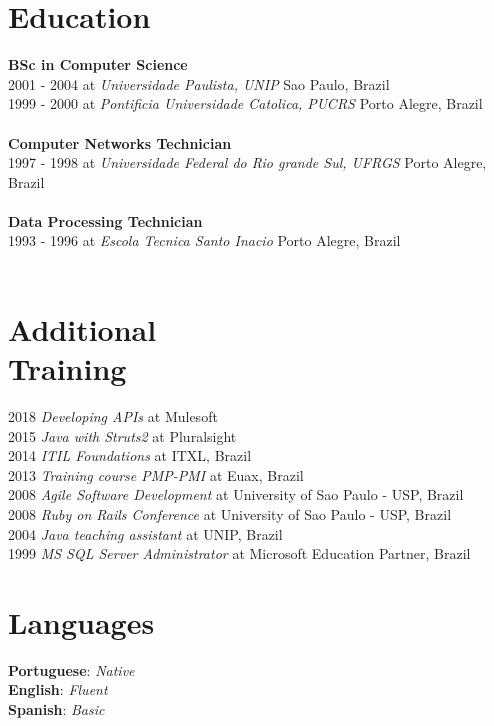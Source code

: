 \documentclass[margin]{res}
\begin{document}
\begin{resume}
\pagebreak
\section{Education}
    \textbf{BSc in Computer Science} \\
          2001 - 2004 at \textit{Universidade Paulista, UNIP} \hfill Sao Paulo, Brazil \\
          1999 - 2000 at \textit{Pontificia Universidade Catolica, PUCRS} \hfill Porto Alegre, Brazil \\
        \\
    \textbf{Computer Networks Technician} \\
          1997 - 1998 at \textit{Universidade Federal do Rio grande Sul, UFRGS} \hfill Porto Alegre, Brazil \\
        \\
    \textbf{Data Processing Technician} \\
          1993 - 1996 at \textit{Escola Tecnica Santo Inacio} \hfill Porto Alegre, Brazil \\
        \\

\section{Additional \\ Training}
    2018 \textit{Developing APIs} at Mulesoft \\
    2015 \textit{Java with Struts2} at Pluralsight \\
    2014 \textit{ITIL Foundations} at ITXL, Brazil \\
    2013 \textit{Training course PMP-PMI} at Euax, Brazil \\
    2008 \textit{Agile Software Development} at University of Sao Paulo - USP, Brazil \\
    2008 \textit{Ruby on Rails Conference} at University of Sao Paulo - USP, Brazil \\
    2004 \textit{Java teaching assistant} at UNIP, Brazil \\
    1999 \textit{MS SQL Server Administrator} at Microsoft Education Partner, Brazil \\

\section{Languages} 
    \textbf{Portuguese}: \textit{Native} \\
    \textbf{English}: \textit{Fluent} \\
    \textbf{Spanish}: \textit{Basic} \\


\end{resume}
\end{document}
